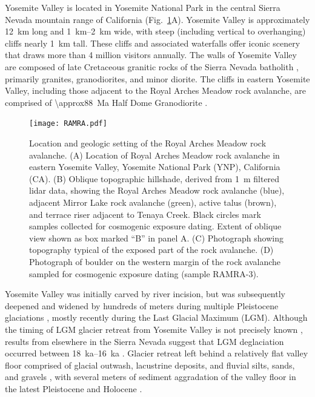 \documentclass[utf8]{frontiersSCNS}
\begin{document}
Yosemite Valley is located in Yosemite National Park in the central Sierra Nevada mountain range of California (Fig.~\ref{RAMRA}A).  Yosemite Valley is approximately \SI{12}{km} long and \SIrange{1}{2}{km} wide, with steep (including vertical to overhanging) cliffs nearly \SI{1}{km} tall.  These cliffs and associated waterfalls offer iconic scenery that draws more than 4 million visitors annually.  The walls of Yosemite Valley are composed of late Cretaceous granitic rocks of the Sierra Nevada batholith \citep{bateman1992plutonism}, primarily granites, granodiorites, and minor diorite. The cliffs in eastern Yosemite Valley, including those adjacent to the Royal Arches Meadow rock avalanche, are comprised of \SI{\approx88}{Ma} Half Dome Granodiorite \citep{peck2002geologic}.



                                   \begin{figure}
  
  \texttt{[image: RAMRA.pdf]}
  \caption{ Location and geologic setting of the Royal Arches Meadow rock avalanche.  (A) Location of Royal Arches Meadow rock avalanche in eastern Yosemite Valley, Yosemite National Park (YNP), California (CA).  (B) Oblique topographic hillshade, derived from \SI{1}{m} filtered lidar data, showing the Royal Arches Meadow rock avalanche (blue), adjacent Mirror Lake rock avalanche (green), active talus (brown), and terrace riser adjacent to Tenaya Creek.  Black circles mark samples collected for cosmogenic  exposure dating.  Extent of oblique view shown as box marked “B” in panel A.  (C) Photograph showing topography typical of the exposed part of the rock avalanche.  (D) Photograph of boulder on the western margin of the rock avalanche sampled for cosmogenic  exposure dating (sample RAMRA-3). \label{RAMRA}}
        
                                     \end{figure}



Yosemite Valley was initially carved by river incision, but was subsequently deepened and widened by hundreds of meters during multiple Pleistocene glaciations \citep{matthes1930geologic, huber1987geologic}, mostly recently during the Last Glacial Maximum (LGM). Although the timing of LGM glacier retreat from Yosemite Valley is not precisely known \citep{wahrhaftig2019extent}, results from elsewhere in the Sierra Nevada suggest that LGM deglaciation occurred between \SIrange{18}{16}{\kilo a} \citep[e.g.][]{rood2011chronology, phillips2017glacial}. Glacier retreat left behind a relatively flat valley floor comprised of glacial outwash, lacustrine deposits, and fluvial silts, sands, and gravels \cite[e.g.][]{matthes1930geologic,huber1987geologic}, with several meters of sediment aggradation of the valley floor in the latest Pleistocene and Holocene \cite[e.g.][]{cordes2013supporting,brody2015near}.
\end{document}
